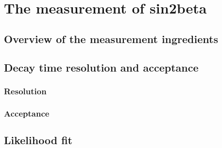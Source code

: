 
\chapter{The measurement of sin2beta}
\label{ch:measurement_of_sin2beta}

\section{Overview of the measurement ingredients}
\label{sec:measurement_of_sin2beta:overview}







\clearpage
\section{Decay time resolution and acceptance}
\label{sec:measurement_of_sin2beta:resolution_and_acceptance}
\subsection{Resolution}
\label{sec:measurement_of_sin2beta:resolution_and_acceptance:resolution}
\subsection{Acceptance}
\label{sec:measurement_of_sin2beta:resolution_and_acceptance:acceptance}
\section{Likelihood fit}
\label{sec:measurement_of_sin2beta:likelihood_fit}

